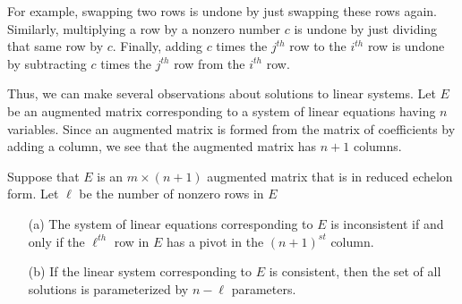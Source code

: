\documentclass{ximera}
\begin{document}
For example, swapping two rows is undone by just swapping these
rows again.  Similarly, multiplying a row by a nonzero number
$c$ is undone by just dividing that same row by $c$.  Finally,
adding $c$ times the $j^{th}$ row to the $i^{th}$ row is undone
by subtracting $c$ times the $j^{th}$ row from the $i^{th}$ row.

Thus, we can make several observations about solutions to linear
systems.  Let $E$ be an augmented matrix corresponding to a system
of linear equations having $n$ variables.  Since an augmented
matrix is formed from the matrix of coefficients by adding a
column, we see that the augmented matrix has $n+1$ columns.

\begin{theorem} \label{number}
Suppose that $E$ is an $m\times(n+1)$ augmented matrix that is in 
reduced echelon form.  Let $\ell$ be the number of nonzero rows in $E$
\begin{enumerate}
\item[(a)] The system of linear equations corresponding to $E$
is inconsistent if and only if the $\ell^{th}$ row in $E$ has a
pivot in the $(n+1)^{st}$ column.
\item[(b)] If the linear system corresponding to $E$ is consistent,
then the set of all solutions is parameterized by $n-\ell$
parameters.
\end{enumerate}  
\end{theorem}
\end{document}
